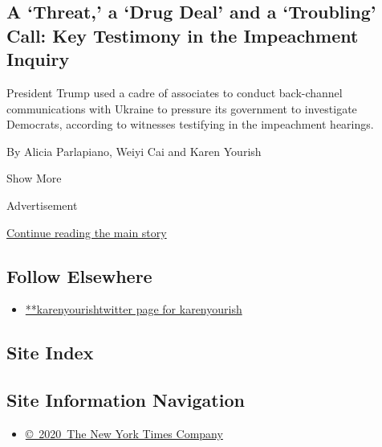 \begin{enumerate}
{  \subsection{A `Threat,' a `Drug Deal' and a `Troubling' Call: Key
  Testimony in the Impeachment
  Inquiry}\label{a-threat-a-drug-deal-and-a-troubling-call-key-testimony-in-the-impeachment-inquiry}}

  President Trump used a cadre of associates to conduct back-channel
  communications with Ukraine to pressure its government to investigate
  Democrats, according to witnesses testifying in the impeachment
  hearings.

  By Alicia Parlapiano, Weiyi Cai and Karen Yourish
\end{enumerate}

Show More

Advertisement

\protect\hyperlink{after-mid2}{Continue reading the main story}

\hypertarget{follow-elsewhere}{%
\subsection{Follow Elsewhere}\label{follow-elsewhere}}

\begin{itemize}
\tightlist
\item
  \href{https://twitter.com/karenyourish}{**karenyourishtwitter page for
  karenyourish}
\end{itemize}

\hypertarget{site-index}{%
\subsection{Site Index}\label{site-index}}

\hypertarget{site-information-navigation}{%
\subsection{Site Information
Navigation}\label{site-information-navigation}}

\begin{itemize}
\tightlist
\item
  \href{https://help.nytimes3xbfgragh.onion/hc/en-us/articles/115014792127-Copyright-notice}{©~2020~The
  New York Times Company}
\end{itemize}

